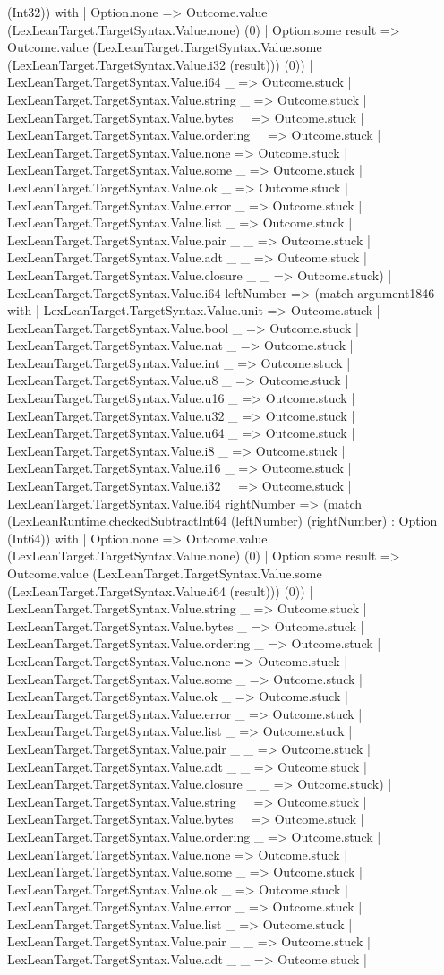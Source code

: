 \documentclass[11pt]{article}
\begin{document}
(Int32)) with | Option.none => Outcome.value (LexLeanTarget.TargetSyntax.Value.none) (0) | Option.some result => Outcome.value (LexLeanTarget.TargetSyntax.Value.some (LexLeanTarget.TargetSyntax.Value.i32 (result))) (0)) | LexLeanTarget.TargetSyntax.Value.i64 \_ => Outcome.stuck | LexLeanTarget.TargetSyntax.Value.string \_ => Outcome.stuck | LexLeanTarget.TargetSyntax.Value.bytes \_ => Outcome.stuck | LexLeanTarget.TargetSyntax.Value.ordering \_ => Outcome.stuck | LexLeanTarget.TargetSyntax.Value.none => Outcome.stuck | LexLeanTarget.TargetSyntax.Value.some \_ => Outcome.stuck | LexLeanTarget.TargetSyntax.Value.ok \_ => Outcome.stuck | LexLeanTarget.TargetSyntax.Value.error \_ => Outcome.stuck | LexLeanTarget.TargetSyntax.Value.list \_ => Outcome.stuck | LexLeanTarget.TargetSyntax.Value.pair \_ \_ => Outcome.stuck | LexLeanTarget.TargetSyntax.Value.adt \_ \_ => Outcome.stuck | LexLeanTarget.TargetSyntax.Value.closure \_ \_ => Outcome.stuck) | LexLeanTarget.TargetSyntax.Value.i64 leftNumber => (match argument1846 with | LexLeanTarget.TargetSyntax.Value.unit => Outcome.stuck | LexLeanTarget.TargetSyntax.Value.bool \_ => Outcome.stuck | LexLeanTarget.TargetSyntax.Value.nat \_ => Outcome.stuck | LexLeanTarget.TargetSyntax.Value.int \_ => Outcome.stuck | LexLeanTarget.TargetSyntax.Value.u8 \_ => Outcome.stuck | LexLeanTarget.TargetSyntax.Value.u16 \_ => Outcome.stuck | LexLeanTarget.TargetSyntax.Value.u32 \_ => Outcome.stuck | LexLeanTarget.TargetSyntax.Value.u64 \_ => Outcome.stuck | LexLeanTarget.TargetSyntax.Value.i8 \_ => Outcome.stuck | LexLeanTarget.TargetSyntax.Value.i16 \_ => Outcome.stuck | LexLeanTarget.TargetSyntax.Value.i32 \_ => Outcome.stuck | LexLeanTarget.TargetSyntax.Value.i64 rightNumber => (match (LexLeanRuntime.checkedSubtractInt64 (leftNumber) (rightNumber) : Option (Int64)) with | Option.none => Outcome.value (LexLeanTarget.TargetSyntax.Value.none) (0) | Option.some result => Outcome.value (LexLeanTarget.TargetSyntax.Value.some (LexLeanTarget.TargetSyntax.Value.i64 (result))) (0)) | LexLeanTarget.TargetSyntax.Value.string \_ => Outcome.stuck | LexLeanTarget.TargetSyntax.Value.bytes \_ => Outcome.stuck | LexLeanTarget.TargetSyntax.Value.ordering \_ => Outcome.stuck | LexLeanTarget.TargetSyntax.Value.none => Outcome.stuck | LexLeanTarget.TargetSyntax.Value.some \_ => Outcome.stuck | LexLeanTarget.TargetSyntax.Value.ok \_ => Outcome.stuck | LexLeanTarget.TargetSyntax.Value.error \_ => Outcome.stuck | LexLeanTarget.TargetSyntax.Value.list \_ => Outcome.stuck | LexLeanTarget.TargetSyntax.Value.pair \_ \_ => Outcome.stuck | LexLeanTarget.TargetSyntax.Value.adt \_ \_ => Outcome.stuck | LexLeanTarget.TargetSyntax.Value.closure \_ \_ => Outcome.stuck) | LexLeanTarget.TargetSyntax.Value.string \_ => Outcome.stuck | LexLeanTarget.TargetSyntax.Value.bytes \_ => Outcome.stuck | LexLeanTarget.TargetSyntax.Value.ordering \_ => Outcome.stuck | LexLeanTarget.TargetSyntax.Value.none => Outcome.stuck | LexLeanTarget.TargetSyntax.Value.some \_ => Outcome.stuck | LexLeanTarget.TargetSyntax.Value.ok \_ => Outcome.stuck | LexLeanTarget.TargetSyntax.Value.error \_ => Outcome.stuck | LexLeanTarget.TargetSyntax.Value.list \_ => Outcome.stuck | LexLeanTarget.TargetSyntax.Value.pair \_ \_ => Outcome.stuck | LexLeanTarget.TargetSyntax.Value.adt \_ \_ => Outcome.stuck | 
\end{document}
